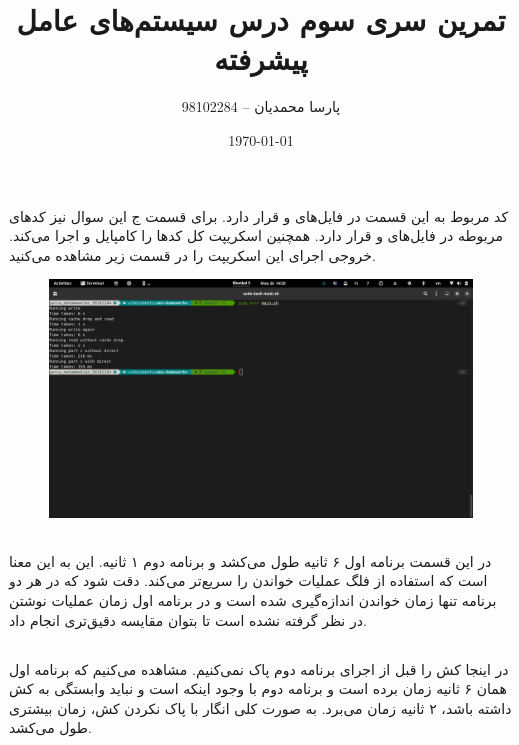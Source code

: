 \documentclass{article}
\title{تمرین سری سوم درس سیستم‌های عامل پیشرفته}
\author{پارسا محمدیان -- 98102284}
\date{\today}
\begin{document}
\maketitle

\section{}
کد مربوط به این قسمت در فایل‌های 
و
قرار دارد. برای قسمت ج این سوال نیز کدهای مربوطه در فایل‌های 
و
قرار دارد. همچنین اسکریپت 
کل کد‌ها را کامپایل و اجرا می‌کند. خروجی اجرای این اسکریپت را در قسمت زیر مشاهده می‌کنید.

\begin{figure}[H]
    \centering
    \includegraphics[width=\textwidth]{images/1.png}
\end{figure}

\subsection{}
در این قسمت برنامه اول ۶ ثانیه طول می‌کشد و برنامه دوم ۱ ثانیه. این به این معنا است 
که استفاده از فلگ 
عملیات خواندن را سریع‌تر می‌کند. دقت شود که در هر دو برنامه 
تنها زمان خواندن اندازه‌گیری شده است و در برنامه اول زمان عملیات نوشتن در نظر گرفته نشده است
تا بتوان مقایسه دقیق‌تری انجام داد.

\subsection{}
در اینجا کش را قبل از اجرای برنامه دوم پاک نمی‌کنیم. مشاهده می‌کنیم که 
برنامه اول همان ۶ ثانیه زمان برده است و برنامه دوم با وجود اینکه 
است و نباید وابستگی به کش داشته باشد، ۲ ثانیه زمان می‌برد. 
به صورت کلی انگار با پاک نکردن کش، 
زمان بیشتری طول می‌کشد. 
\end{document}
